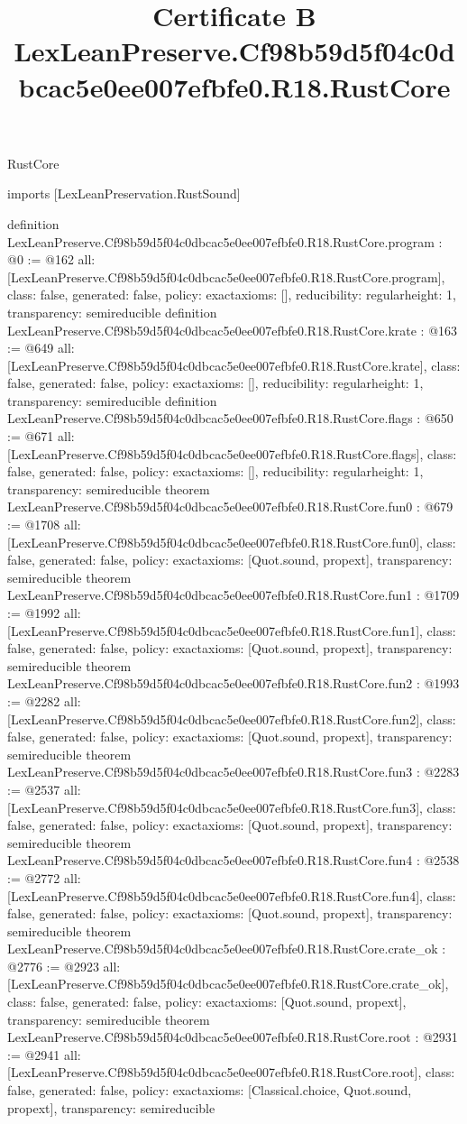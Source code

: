 \begin{lexlean}{RustCore}
\title{Certificate B LexLeanPreserve.Cf98b59d5f04c0dbcac5e0ee007efbfe0.R18.RustCore}
\begin{coremodule}
imports [LexLeanPreservation.RustSound]

definition LexLeanPreserve.Cf98b59d5f04c0dbcac5e0ee007efbfe0.R18.RustCore.program : @0 := @162 {
  all: [LexLeanPreserve.Cf98b59d5f04c0dbcac5e0ee007efbfe0.R18.RustCore.program],
  class: false,
  generated: false,
  policy: exact{axioms: []},
  reducibility: regular{height: 1},
  transparency: semireducible
}
definition LexLeanPreserve.Cf98b59d5f04c0dbcac5e0ee007efbfe0.R18.RustCore.krate : @163 := @649 {
  all: [LexLeanPreserve.Cf98b59d5f04c0dbcac5e0ee007efbfe0.R18.RustCore.krate],
  class: false,
  generated: false,
  policy: exact{axioms: []},
  reducibility: regular{height: 1},
  transparency: semireducible
}
definition LexLeanPreserve.Cf98b59d5f04c0dbcac5e0ee007efbfe0.R18.RustCore.flags : @650 := @671 {
  all: [LexLeanPreserve.Cf98b59d5f04c0dbcac5e0ee007efbfe0.R18.RustCore.flags],
  class: false,
  generated: false,
  policy: exact{axioms: []},
  reducibility: regular{height: 1},
  transparency: semireducible
}
theorem LexLeanPreserve.Cf98b59d5f04c0dbcac5e0ee007efbfe0.R18.RustCore.fun0 : @679 := @1708 {
  all: [LexLeanPreserve.Cf98b59d5f04c0dbcac5e0ee007efbfe0.R18.RustCore.fun0],
  class: false,
  generated: false,
  policy: exact{axioms: [Quot.sound, propext]},
  transparency: semireducible
}
theorem LexLeanPreserve.Cf98b59d5f04c0dbcac5e0ee007efbfe0.R18.RustCore.fun1 : @1709 := @1992 {
  all: [LexLeanPreserve.Cf98b59d5f04c0dbcac5e0ee007efbfe0.R18.RustCore.fun1],
  class: false,
  generated: false,
  policy: exact{axioms: [Quot.sound, propext]},
  transparency: semireducible
}
theorem LexLeanPreserve.Cf98b59d5f04c0dbcac5e0ee007efbfe0.R18.RustCore.fun2 : @1993 := @2282 {
  all: [LexLeanPreserve.Cf98b59d5f04c0dbcac5e0ee007efbfe0.R18.RustCore.fun2],
  class: false,
  generated: false,
  policy: exact{axioms: [Quot.sound, propext]},
  transparency: semireducible
}
theorem LexLeanPreserve.Cf98b59d5f04c0dbcac5e0ee007efbfe0.R18.RustCore.fun3 : @2283 := @2537 {
  all: [LexLeanPreserve.Cf98b59d5f04c0dbcac5e0ee007efbfe0.R18.RustCore.fun3],
  class: false,
  generated: false,
  policy: exact{axioms: [Quot.sound, propext]},
  transparency: semireducible
}
theorem LexLeanPreserve.Cf98b59d5f04c0dbcac5e0ee007efbfe0.R18.RustCore.fun4 : @2538 := @2772 {
  all: [LexLeanPreserve.Cf98b59d5f04c0dbcac5e0ee007efbfe0.R18.RustCore.fun4],
  class: false,
  generated: false,
  policy: exact{axioms: [Quot.sound, propext]},
  transparency: semireducible
}
theorem LexLeanPreserve.Cf98b59d5f04c0dbcac5e0ee007efbfe0.R18.RustCore.crate_ok : @2776 := @2923 {
  all: [LexLeanPreserve.Cf98b59d5f04c0dbcac5e0ee007efbfe0.R18.RustCore.crate_ok],
  class: false,
  generated: false,
  policy: exact{axioms: [Quot.sound, propext]},
  transparency: semireducible
}
theorem LexLeanPreserve.Cf98b59d5f04c0dbcac5e0ee007efbfe0.R18.RustCore.root : @2931 := @2941 {
  all: [LexLeanPreserve.Cf98b59d5f04c0dbcac5e0ee007efbfe0.R18.RustCore.root],
  class: false,
  generated: false,
  policy: exact{axioms: [Classical.choice, Quot.sound, propext]},
  transparency: semireducible
}


\end{coremodule}
\end{lexlean}
